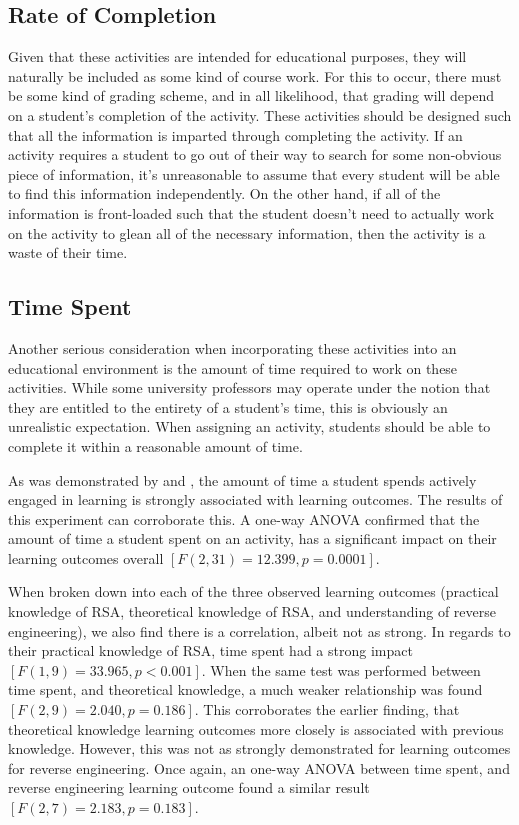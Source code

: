     \subsection{Rate of Completion}
        Given that these activities are intended for educational purposes, they will naturally be included as some kind of course work.
        For this to occur, there must be some kind of grading scheme, and in all likelihood, that grading will depend on a student's completion of the activity. 
        These activities should be designed such that all the information is imparted through completing the activity. 
        If an activity requires a student to go out of their way to search for some non-obvious piece of information, it's unreasonable to assume that every student will be able to find this information independently. 
        On the other hand, if all of the information is front-loaded such that the student doesn't need to actually work on the activity to glean all of the necessary information, then the activity is a waste of their time. 


    \subsection{Time Spent}
        Another serious consideration when incorporating these activities into an educational environment is the amount of time required to work on these activities. 
        While some university professors may operate under the notion that they are entitled to the entirety of a student's time, this is obviously an unrealistic expectation. 
        When assigning an activity, students should be able to complete it within a reasonable amount of time. 
        
        As was demonstrated by \citeauthor{C-Linehan} and \citeauthor{Z-Zeng}, the amount of time a student spends actively engaged in learning is strongly associated with learning outcomes. 
        The results of this experiment can corroborate this. 
        A one-way ANOVA confirmed that the amount of time a student spent on an activity, has a significant impact on their learning outcomes overall $[F(2,31)=12.399, p=0.0001]$.
        
        When broken down into each of the three observed learning outcomes 
        (practical knowledge of RSA, theoretical knowledge of RSA, and understanding of reverse engineering),
        we also find there is a correlation, albeit not as strong. 
        In regards to their practical knowledge of RSA, time spent had a strong impact $[F(1,9)=33.965, p<0.001]$. 
        When the same test was performed between time spent, and theoretical knowledge, a much weaker relationship was found $[F(2, 9)=2.040, p=0.186]$. 
        This corroborates the earlier finding, that theoretical knowledge learning outcomes more closely is associated with previous knowledge. 
        However, this was not as strongly demonstrated for learning outcomes for reverse engineering. 
        Once again, an one-way ANOVA between time spent, and reverse engineering learning outcome found a similar result $[F(2, 7)=2.183, p=0.183]$. 

